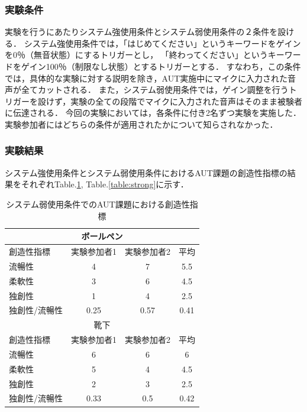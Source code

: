 \documentclass[a4paper]{jarticle}
\begin{document}
\subsubsection{実験条件}
実験を行うにあたりシステム強使用条件とシステム弱使用条件の２条件を設ける．
システム強使用条件では，「はじめてください」というキーワードをゲインを0％（無音状態）にするトリガーとし，
「終わってください」というキーワードをゲイン100％（制限なし状態）とするトリガーとする．
すなわち，この条件では，具体的な実験に対する説明を除き，AUT実施中にマイクに入力された音声が全てカットされる．
また，システム弱使用条件では，ゲイン調整を行うトリガーを設けず，実験の全ての段階でマイクに入力された音声はそのまま被験者に伝達される．
今回の実験においては，各条件に付き2名ずつ実験を実施した．実験参加者にはどちらの条件が適用されたかについて知らされなかった．

\subsubsection{実験結果}
システム強使用条件とシステム弱使用条件におけるAUT課題の創造性指標の結果をそれぞれTable.\ref{table:week}, Table.\ref{table:strong}に示す．
\begin{table}[h]
    \caption{システム弱使用条件でのAUT課題における創造性指標}
    \label{table:week}
    \centering
    \begin{tabular}{lccc}
      \hline
      \multicolumn{4}{c}{ボールペン} \\
      \hline
      創造性指標  & 実験参加者1  &  実験参加者2  &  平均 \\
      \hline
      流暢性  & 4  & 7 & 5.5 \\
      柔軟性  & 3   & 6  & 4.5 \\
      独創性  & 1  & 4 & 2.5 \\
      独創性/流暢性  & 0.25 & 0.57 & 0.41 \\
      \hline
      \multicolumn{4}{c}{靴下} \\
      \hline
      創造性指標  & 実験参加者1  &  実験参加者2  &  平均 \\
      \hline
      流暢性  & 6  & 6 & 6 \\
      柔軟性  & 5   & 4  & 4.5 \\
      独創性  & 2  & 3 & 2.5 \\
      独創性/流暢性  & 0.33 & 0.5 & 0.42 \\
      \hline
    \end{tabular}
  \end{table}
\end{document}
